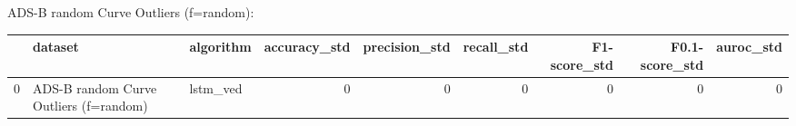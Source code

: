 ADS-B random Curve Outliers (f=random):

\begin{tabular}{rllrrrrrr}
\hline
    & dataset                                & algorithm   &   accuracy\_std &   precision\_std &   recall\_std &   F1-score\_std &   F0.1-score\_std &   auroc\_std \\
\hline
  0 & ADS-B random Curve Outliers (f=random) & lstm\_ved    &              0 &               0 &            0 &              0 &                0 &           0 \\
\hline
\end{tabular}

